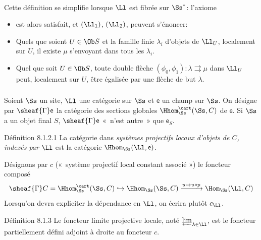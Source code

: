 \paragraph{}
Cette définition se simplifie lorsque $\Ll$ est fibrée
  sur $\Ss^{\ast}$: l'axiome
\begin{itemize}
\item[$(\Ll_\ast 0)$] est alors satisfait, et $(\Ll_1)$,
  $(\Ll_2)$, peuvent s'énoncer:

\item[$(\Ll'1)$] Quels que soient $U \in \Ob S$ et la famille finie
  $\lambda_i$ d'objets de $\Ll_U$, localement sur $U$, il
  existe $\mu$ s'envoyant dans tous les $\lambda_i$.

\item[$(\Ll'2)$] Quel que soit $U \in \Ob S$, toute double flèche
  $(\phi_0, \phi_1) : \lambda \rightrightarrows \mu$ dans
  $\Ll_U$ peut, localement sur $U$, être égalisée par
  une flèche de but $\lambda$.
\end{itemize}

\subsubsection{}
Soient $\Ss$ un site, $\Ll$ une catégorie sur $\Ss$ et
$\mathsf{e}$ un champ sur $\Ss$. On désigne par $\sheaf{\Gamma}\mathsf{e}$ la
catégorie des sections globales $\Hhom^{\cart}_{\Ss}(\Ss, C)$ de
$\mathsf{e}$. Si $\Ss$ a un objet final $S$,
$\sheaf{\Gamma}\mathsf{e}$ « n'est
autre » que $\mathsf{e}_S$.

\begin{enonce*}{Définition 8.1.2.1}
La catégorie dans \emph{systèmes projectifs locaux d'objets de $C$,
indexés par} $\Ll$ est la catégorie $\Hhom_{\Ss}(\Ll, \mathsf{e})$.
\end{enonce*}

Désignons par $c$ (« système projectif local constant
associé ») le foncteur composé
$$
\sheaf{\Gamma} C = \Hhom^{\cart}_{\Ss} (\Ss, C) \hookrightarrow \Hhom_{\Ss}(\Ss, C)
\xrightarrow{u \mapsto u \circ p} \Hom_{\Ss}(\Ll, C)
$$
Lorsqu'on devra expliciter la dépendance en $\Ll$, on
écrira plutôt $c_{\Ll}$.

\begin{enonce*}{Définition 8.1.3}
  Le foncteur limite projective locale, noté $\varprojlim_{\lambda
    \in \Ll}$, est le foncteur partiellement défini
  adjoint à droite au foncteur $c$.
\end{enonce*}

